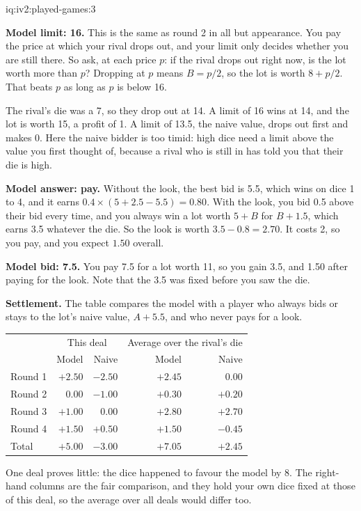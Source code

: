 \begin{solution}{iq:iv2:played-games:3}
\ivstop

\textbf{Model limit: 16.} This is the same as round 2 in all but appearance. You pay the price at which your rival drops out, and your limit only decides whether you are still there. So ask, at each price $p$: if the rival drops out right now, is the lot worth more than $p$? Dropping at $p$ means $B = p/2$, so the lot is worth $8 + p/2$. That beats $p$ as long as $p$ is below 16.

The rival's die was a 7, so they drop out at 14. A limit of 16 wins at 14, and the lot is worth 15, a profit of 1. A limit of 13.5, the naive value, drops out first and makes 0. Here the naive bidder is too timid: high dice need a limit above the value you first thought of, because a rival who is still in has told you that their die is high.

\ivstop
\textbf{Model answer: pay.} Without the look, the best bid is 5.5, which wins on dice 1 to 4, and it earns $0.4 \times (5 + 2.5 - 5.5) = 0.80$. With the look, you bid 0.5 above their bid every time, and you always win a lot worth $5 + B$ for $B + 1.5$, which earns 3.5 whatever the die. So the look is worth $3.5 - 0.8 = 2.70$. It costs 2, so you pay, and you expect $1.50$ overall.

\ivstop
\textbf{Model bid: 7.5.} You pay 7.5 for a lot worth 11, so you gain 3.5, and 1.50 after paying for the look. Note that the 3.5 was fixed before you saw the die.

\medskip
\textbf{Settlement.} The table compares the model with a player who always bids or stays to the lot's naive value, $A + 5.5$, and who never pays for a look.
\begin{center}\small
\begin{tabular}{@{}lrrrr@{}}
 & \multicolumn{2}{c}{This deal} & \multicolumn{2}{c}{Average over the rival's die} \\
 & Model & Naive & Model & Naive \\ \hline
Round 1 & $+2.50$ & $-2.50$ & $+2.45$ & $0.00$ \\
Round 2 & $0.00$ & $-1.00$ & $+0.30$ & $+0.20$ \\
Round 3 & $+1.00$ & $0.00$ & $+2.80$ & $+2.70$ \\
Round 4 & $+1.50$ & $+0.50$ & $+1.50$ & $-0.45$ \\ \hline
Total & $+5.00$ & $-3.00$ & $+7.05$ & $+2.45$
\end{tabular}
\end{center}
One deal proves little: the dice happened to favour the model by 8. The right-hand columns are the fair comparison, and they hold your own dice fixed at those of this deal, so the average over all deals would differ too.


\end{solution}

